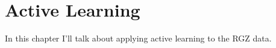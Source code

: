 
\chapter{Active Learning}
\label{cha:active-learning}

In this chapter I'll talk about applying active learning to the RGZ data.
